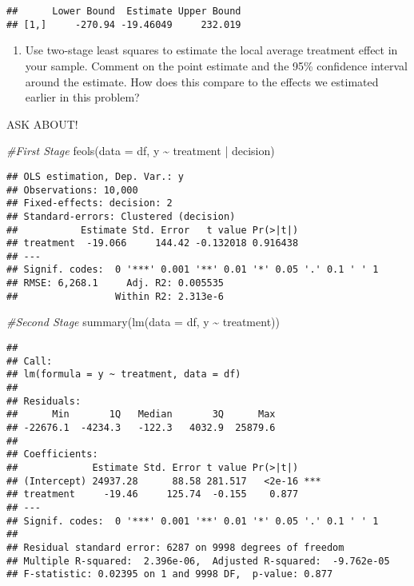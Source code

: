 \documentclass[
]{article}
\newenvironment{Shaded}{\begin{snugshade}}{\end{snugshade}}
\newcommand{\AttributeTok}[1]{\textcolor[rgb]{0.77,0.63,0.00}{#1}}
\newcommand{\CommentTok}[1]{\textcolor[rgb]{0.56,0.35,0.01}{\textit{#1}}}
\newcommand{\FunctionTok}[1]{\textcolor[rgb]{0.00,0.00,0.00}{#1}}
\newcommand{\NormalTok}[1]{#1}
\newcommand{\SpecialCharTok}[1]{\textcolor[rgb]{0.00,0.00,0.00}{#1}}
\providecommand{\tightlist}{%
  \setlength{\itemsep}{0pt}\setlength{\parskip}{0pt}}
\begin{document}
\begin{verbatim}
##      Lower Bound  Estimate Upper Bound
## [1,]     -270.94 -19.46049     232.019
\end{verbatim}

\begin{enumerate}
\def\labelenumi{\arabic{enumi}.}
\setcounter{enumi}{5}
\tightlist
\item
  Use two-stage least squares to estimate the local average treatment
  effect in your sample. Comment on the point estimate and the 95\%
  confidence interval around the estimate. How does this compare to the
  effects we estimated earlier in this problem?
\end{enumerate}

ASK ABOUT!

\begin{Shaded}
\begin{Highlighting}[]
\CommentTok{\#First Stage}
\FunctionTok{feols}\NormalTok{(}\AttributeTok{data =}\NormalTok{ df, y }\SpecialCharTok{\textasciitilde{}}\NormalTok{ treatment }\SpecialCharTok{|}\NormalTok{ decision)}
\end{Highlighting}
\end{Shaded}

\begin{verbatim}
## OLS estimation, Dep. Var.: y
## Observations: 10,000 
## Fixed-effects: decision: 2
## Standard-errors: Clustered (decision) 
##           Estimate Std. Error   t value Pr(>|t|) 
## treatment  -19.066     144.42 -0.132018 0.916438 
## ---
## Signif. codes:  0 '***' 0.001 '**' 0.01 '*' 0.05 '.' 0.1 ' ' 1
## RMSE: 6,268.1     Adj. R2: 0.005535
##                 Within R2: 2.313e-6
\end{verbatim}

\begin{Shaded}
\begin{Highlighting}[]
\CommentTok{\#Second Stage}
\FunctionTok{summary}\NormalTok{(}\FunctionTok{lm}\NormalTok{(}\AttributeTok{data =}\NormalTok{ df, y }\SpecialCharTok{\textasciitilde{}}\NormalTok{ treatment))}
\end{Highlighting}
\end{Shaded}

\begin{verbatim}
## 
## Call:
## lm(formula = y ~ treatment, data = df)
## 
## Residuals:
##      Min       1Q   Median       3Q      Max 
## -22676.1  -4234.3   -122.3   4032.9  25879.6 
## 
## Coefficients:
##             Estimate Std. Error t value Pr(>|t|)    
## (Intercept) 24937.28      88.58 281.517   <2e-16 ***
## treatment     -19.46     125.74  -0.155    0.877    
## ---
## Signif. codes:  0 '***' 0.001 '**' 0.01 '*' 0.05 '.' 0.1 ' ' 1
## 
## Residual standard error: 6287 on 9998 degrees of freedom
## Multiple R-squared:  2.396e-06,  Adjusted R-squared:  -9.762e-05 
## F-statistic: 0.02395 on 1 and 9998 DF,  p-value: 0.877
\end{verbatim}
\end{document}

